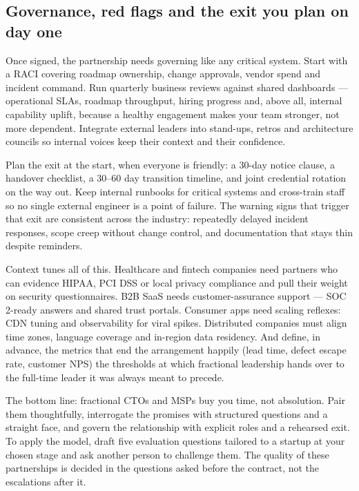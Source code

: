 \subsection{Governance, red flags and the exit you plan on day one}


Once signed, the partnership needs governing like any critical system. Start with a RACI covering roadmap ownership, change approvals, vendor spend and incident command. Run quarterly business reviews against shared dashboards — operational SLAs, roadmap throughput, hiring progress and, above all, internal capability uplift, because a healthy engagement makes your team stronger, not more dependent. Integrate external leaders into stand-ups, retros and architecture councils so internal voices keep their context and their confidence.


Plan the exit at the start, when everyone is friendly: a 30-day notice clause, a handover checklist, a 30–60 day transition timeline, and joint credential rotation on the way out. Keep internal runbooks for critical systems and cross-train staff so no single external engineer is a point of failure. The warning signs that trigger that exit are consistent across the industry: repeatedly delayed incident responses, scope creep without change control, and documentation that stays thin despite reminders.


Context tunes all of this. Healthcare and fintech companies need partners who can evidence HIPAA, PCI DSS or local privacy compliance and pull their weight on security questionnaires. B2B SaaS needs customer-assurance support — SOC 2-ready answers and shared trust portals. Consumer apps need scaling reflexes: CDN tuning and observability for viral spikes. Distributed companies must align time zones, language coverage and in-region data residency. And define, in advance, the metrics that end the arrangement happily (lead time, defect escape rate, customer NPS) the thresholds at which fractional leadership hands over to the full-time leader it was always meant to precede.


The bottom line: fractional CTOs and MSPs buy you time, not absolution. Pair them thoughtfully, interrogate the promises with structured questions and a straight face, and govern the relationship with explicit roles and a rehearsed exit. To apply the model, draft five evaluation questions tailored to a startup at your chosen stage and ask another person to challenge them. The quality of these partnerships is decided in the questions asked before the contract, not the escalations after it.

